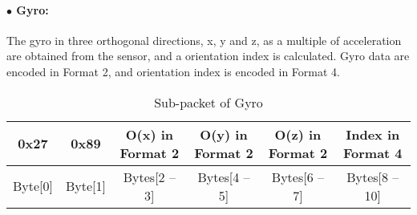 \paragraph{$\bullet$ Gyro:}
The gyro in three orthogonal directions, x, y and z, as a multiple of acceleration are obtained from the sensor, and a orientation index is calculated. 
Gyro data are encoded in Format 2, and orientation index is encoded in Format 4.

\begin{table}[h!]
    \centering
    \caption{Sub-packet of Gyro}
    \begin{tabular}{|c|c|c|c|c|c|}
        \hline
        \rowcolor{black!8}
        \textbf{0x27} & \textbf{0x89} & \textbf{O(x) in Format 2} & \textbf{O(y) in Format 2} & \textbf{O(z) in Format 2}& \textbf{Index in Format 4}\\
        \hline
        Byte[0] & Byte[1] & Bytes[2 -- 3] & Bytes[4 -- 5] & Bytes[6 -- 7] & Bytes[8 -- 10] \\ \hline
    \end{tabular}
\end{table}


